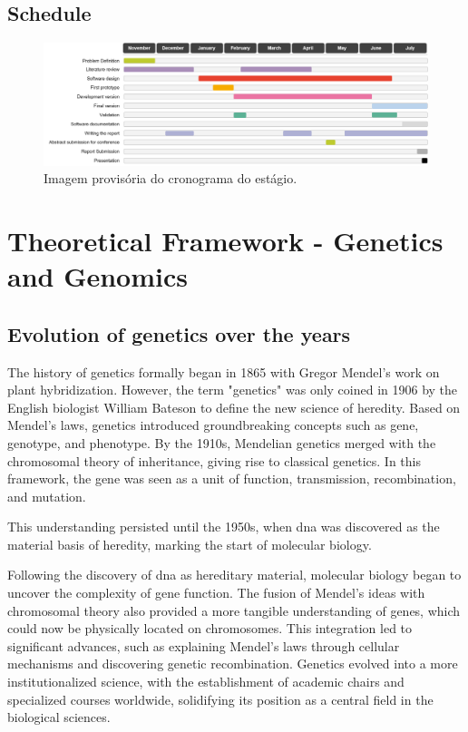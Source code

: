 \subsection{Schedule}

\begin{figure}[H]
    \centering
    \includegraphics[width=1\textwidth]{figs/schedule.png}
    \caption{Imagem provisória do cronograma do estágio.}
    \label{fig:timeline}
\end{figure}

\section{Theoretical Framework - Genetics and Genomics} 
\subsection{Evolution of genetics over the years}

The history of genetics formally began in 1865 with Gregor Mendel's work on plant hybridization. However, the term "genetics" was only coined in 1906 by the English biologist William Bateson to define the new science of heredity. Based on Mendel's laws, genetics introduced groundbreaking concepts such as gene, genotype, and phenotype. By the 1910s, Mendelian genetics merged with the chromosomal theory of inheritance, giving rise to classical genetics. In this framework, the gene was seen as a unit of function, transmission, recombination, and mutation. \cite{genetictimeline2}

This understanding persisted until the 1950s, when \ac{dna} was discovered as the material basis of heredity, marking the start of molecular biology. \cite{Gayon2016}

Following the discovery of \ac{dna} as hereditary material, molecular biology began to uncover the complexity of gene function. The fusion of Mendel's ideas with chromosomal theory also provided a more tangible understanding of genes, which could now be physically located on chromosomes. This integration led to significant advances, such as explaining Mendel's laws through cellular mechanisms and discovering genetic recombination. Genetics evolved into a more institutionalized science, with the establishment of academic chairs and specialized courses worldwide, solidifying its position as a central field in the biological sciences. \cite{Gayon2016}

